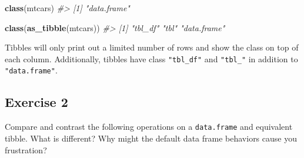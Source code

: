 \documentclass[]{book}
\newenvironment{Shaded}{\begin{snugshade}}{\end{snugshade}}
\newcommand{\CommentTok}[1]{\textcolor[rgb]{0.56,0.35,0.01}{\textit{#1}}}
\newcommand{\DataTypeTok}[1]{\textcolor[rgb]{0.13,0.29,0.53}{#1}}
\newcommand{\DecValTok}[1]{\textcolor[rgb]{0.00,0.00,0.81}{#1}}
\newcommand{\KeywordTok}[1]{\textcolor[rgb]{0.13,0.29,0.53}{\textbf{#1}}}
\newcommand{\NormalTok}[1]{#1}
\newcommand{\OperatorTok}[1]{\textcolor[rgb]{0.81,0.36,0.00}{\textbf{#1}}}
\newcommand{\StringTok}[1]{\textcolor[rgb]{0.31,0.60,0.02}{#1}}
\theoremstyle{definition}
\theoremstyle{definition}
\theoremstyle{definition}
\theoremstyle{remark}
\begin{document}
\begin{Shaded}
\begin{Highlighting}[]
\KeywordTok{class}\NormalTok{(mtcars)}
\CommentTok{#> [1] "data.frame"}
\end{Highlighting}
\end{Shaded}

\begin{Shaded}
\begin{Highlighting}[]
\KeywordTok{class}\NormalTok{(}\KeywordTok{as_tibble}\NormalTok{(mtcars))}
\CommentTok{#> [1] "tbl_df"     "tbl"        "data.frame"}
\end{Highlighting}
\end{Shaded}

Tibbles will only print out a limited number of rows and show the class
on top of each column. Additionally, tibbles have class
\texttt{"tbl\_df"} and \texttt{"tbl\_"} in addition to
\texttt{"data.frame"}.

\hypertarget{exercise-2-12}{%
\subsection{Exercise 2}\label{exercise-2-12}}

Compare and contrast the following operations on a \texttt{data.frame}
and equivalent tibble. What is different? Why might the default data
frame behaviors cause you frustration?

\begin{Shaded}
\end{Shaded}

\begin{Shaded}
\end{Shaded}
\end{document}
